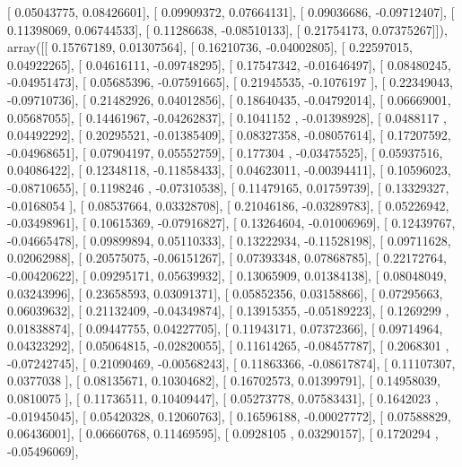 \documentclass{article}
\begin{document}
       [ 0.05043775,  0.08426601],
       [ 0.09909372,  0.07664131],
       [ 0.09036686, -0.09712407],
       [ 0.11398069,  0.06744533],
       [ 0.11286638, -0.08510133],
       [ 0.21754173,  0.07375267]]), array([[ 0.15767189,  0.01307564],
       [ 0.16210736, -0.04002805],
       [ 0.22597015,  0.04922265],
       [ 0.04616111, -0.09748295],
       [ 0.17547342, -0.01646497],
       [ 0.08480245, -0.04951473],
       [ 0.05685396, -0.07591665],
       [ 0.21945535, -0.1076197 ],
       [ 0.22349043, -0.09710736],
       [ 0.21482926,  0.04012856],
       [ 0.18640435, -0.04792014],
       [ 0.06669001,  0.05687055],
       [ 0.14461967, -0.04262837],
       [ 0.1041152 , -0.01398928],
       [ 0.0488117 ,  0.04492292],
       [ 0.20295521, -0.01385409],
       [ 0.08327358, -0.08057614],
       [ 0.17207592, -0.04968651],
       [ 0.07904197,  0.05552759],
       [ 0.177304  , -0.03475525],
       [ 0.05937516,  0.04086422],
       [ 0.12348118, -0.11858433],
       [ 0.04623011, -0.00394411],
       [ 0.10596023, -0.08710655],
       [ 0.1198246 , -0.07310538],
       [ 0.11479165,  0.01759739],
       [ 0.13329327, -0.0168054 ],
       [ 0.08537664,  0.03328708],
       [ 0.21046186, -0.03289783],
       [ 0.05226942, -0.03498961],
       [ 0.10615369, -0.07916827],
       [ 0.13264604, -0.01006969],
       [ 0.12439767, -0.04665478],
       [ 0.09899894,  0.05110333],
       [ 0.13222934, -0.11528198],
       [ 0.09711628,  0.02062988],
       [ 0.20575075, -0.06151267],
       [ 0.07393348,  0.07868785],
       [ 0.22172764, -0.00420622],
       [ 0.09295171,  0.05639932],
       [ 0.13065909,  0.01384138],
       [ 0.08048049,  0.03243996],
       [ 0.23658593,  0.03091371],
       [ 0.05852356,  0.03158866],
       [ 0.07295663,  0.06039632],
       [ 0.21132409, -0.04349874],
       [ 0.13915355, -0.05189223],
       [ 0.1269299 ,  0.01838874],
       [ 0.09447755,  0.04227705],
       [ 0.11943171,  0.07372366],
       [ 0.09714964,  0.04323292],
       [ 0.05064815, -0.02820055],
       [ 0.11614265, -0.08457787],
       [ 0.2068301 , -0.07242745],
       [ 0.21090469, -0.00568243],
       [ 0.11863366, -0.08617874],
       [ 0.11107307,  0.0377038 ],
       [ 0.08135671,  0.10304682],
       [ 0.16702573,  0.01399791],
       [ 0.14958039,  0.0810075 ],
       [ 0.11736511,  0.10409447],
       [ 0.05273778,  0.07583431],
       [ 0.1642023 , -0.01945045],
       [ 0.05420328,  0.12060763],
       [ 0.16596188, -0.00027772],
       [ 0.07588829,  0.06436001],
       [ 0.06660768,  0.11469595],
       [ 0.0928105 ,  0.03290157],
       [ 0.1720294 , -0.05496069],
\end{document}
